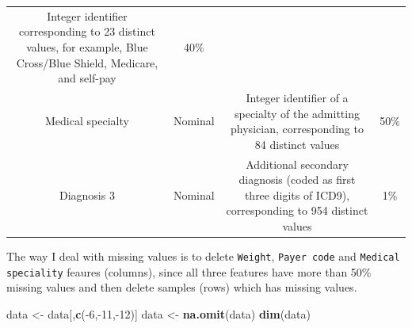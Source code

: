 \documentclass[]{article}
\newenvironment{Shaded}{\begin{snugshade}}{\end{snugshade}}
\newcommand{\KeywordTok}[1]{\textcolor[rgb]{0.13,0.29,0.53}{\textbf{{#1}}}}
\newcommand{\DecValTok}[1]{\textcolor[rgb]{0.00,0.00,0.81}{{#1}}}
\newcommand{\StringTok}[1]{\textcolor[rgb]{0.31,0.60,0.02}{{#1}}}
\newcommand{\NormalTok}[1]{{#1}}
\begin{document}
\begin{longtable}[c]{@{}cccc@{}}
\begin{minipage}[t]{0.35\columnwidth}
Integer identifier corresponding to 23 distinct values, for example,
Blue Cross/Blue Shield, Medicare, and self-pay
\strut\end{minipage} &
\begin{minipage}[t]{0.24\columnwidth}\centering\strut
40\%
\strut\end{minipage}\tabularnewline
\begin{minipage}[t]{0.20\columnwidth}\centering\strut
Medical specialty
\strut\end{minipage} &
\begin{minipage}[t]{0.09\columnwidth}\centering\strut
Nominal
\strut\end{minipage} &
\begin{minipage}[t]{0.35\columnwidth}\centering\strut
Integer identifier of a specialty of the admitting physician,
corresponding to 84 distinct values
\strut\end{minipage} &
\begin{minipage}[t]{0.24\columnwidth}\centering\strut
50\%
\strut\end{minipage}\tabularnewline
\begin{minipage}[t]{0.20\columnwidth}\centering\strut
Diagnosis 3
\strut\end{minipage} &
\begin{minipage}[t]{0.09\columnwidth}\centering\strut
Nominal
\strut\end{minipage} &
\begin{minipage}[t]{0.35\columnwidth}\centering\strut
Additional secondary diagnosis (coded as first three digits of ICD9),
corresponding to 954 distinct values
\strut\end{minipage} &
\begin{minipage}[t]{0.24\columnwidth}\centering\strut
1\%
\strut\end{minipage}\tabularnewline
\bottomrule
\end{longtable}

The way I deal with missing values is to delete \texttt{Weight},
\texttt{Payer code} and \texttt{Medical speciality} feaures (columns),
since all three features have more than 50\% missing values and then
delete samples (rows) which has missing values.

\begin{Shaded}
\begin{Highlighting}[]
\NormalTok{data <-}\StringTok{ }\NormalTok{data[,}\KeywordTok{c}\NormalTok{(-}\DecValTok{6}\NormalTok{,-}\DecValTok{11}\NormalTok{,-}\DecValTok{12}\NormalTok{)]}
\NormalTok{data <-}\StringTok{ }\KeywordTok{na.omit}\NormalTok{(data)}
\KeywordTok{dim}\NormalTok{(data)}
\end{Highlighting}
\end{Shaded}
\end{document}

